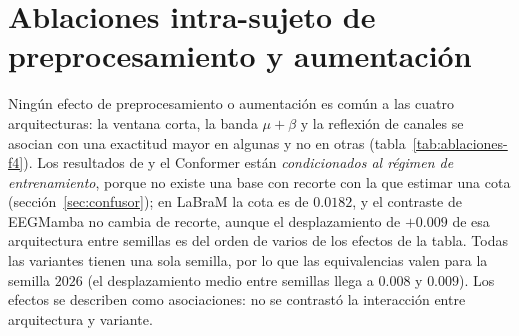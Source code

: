 \section{Ablaciones intra-sujeto de preprocesamiento y aumentación}
\label{sec:ablaciones-f4}

Ningún efecto de preprocesamiento o aumentación es común a las cuatro arquitecturas: la ventana corta, la
banda $\mu+\beta$ y la reflexión de canales se asocian con una exactitud mayor en algunas y no en otras
(tabla~\ref{tab:ablaciones-f4}). Los resultados de \eegnet{} y el Conformer están \emph{condicionados al
régimen de entrenamiento}, porque no existe una base con recorte con la que estimar una cota
(sección~\ref{sec:confusor}); en LaBraM la cota es de $0.0182$, y el contraste de EEGMamba no cambia de
recorte, aunque el desplazamiento de $+0.009$ de esa arquitectura entre semillas es del orden de varios
de los efectos de la tabla. Todas las variantes tienen una sola semilla, por lo que las equivalencias valen
para la semilla $2026$ (el desplazamiento medio entre semillas llega a $0.008$ y $0.009$). Los efectos se
describen como asociaciones: no se contrastó la interacción entre arquitectura y variante.

